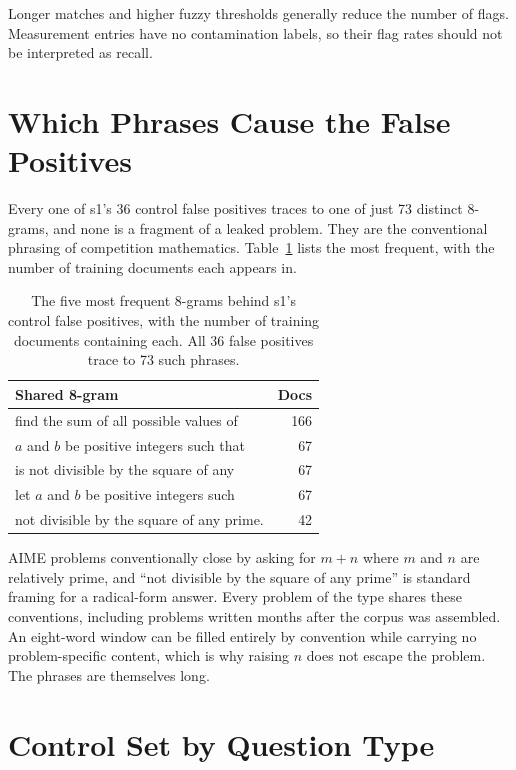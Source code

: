 \documentclass[11pt]{article}
\begin{document}
Longer matches and higher fuzzy thresholds generally reduce the number of flags. Measurement entries have no contamination labels, so their flag rates should not be interpreted as recall.

\section{Which Phrases Cause the False Positives}
\label{app:mechanism}

Every one of s1's 36 control false positives traces to one of just 73 distinct 8-grams, and none is a fragment of a leaked problem. They are the conventional phrasing of competition mathematics. Table~\ref{tab:mechanism} lists the most frequent, with the number of training documents each appears in.

\begin{table}[!t]
\centering
\small
\begin{tabular}{@{}lr@{}}
\toprule
Shared 8-gram & Docs \\
\midrule
find the sum of all possible values of     & 166 \\
$a$ and $b$ be positive integers such that &  67 \\
is not divisible by the square of any      &  67 \\
let $a$ and $b$ be positive integers such  &  67 \\
not divisible by the square of any prime.  &  42 \\
\bottomrule
\end{tabular}
\caption{The five most frequent 8-grams behind s1's control false positives, with the number of training documents containing each. All 36 false positives trace to 73 such phrases.}
\label{tab:mechanism}
\end{table}

AIME problems conventionally close by asking for $m + n$ where $m$ and $n$ are relatively prime, and ``not divisible by the square of any prime'' is standard framing for a radical-form answer. Every problem of the type shares these conventions, including problems written months after the corpus was assembled. An eight-word window can be filled entirely by convention while carrying no problem-specific content, which is why raising $n$ does not escape the problem. The phrases are themselves long.

\section{Control Set by Question Type}
\label{app:strata}
\end{document}

